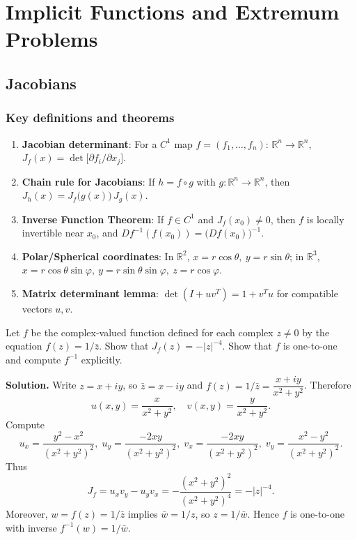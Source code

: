 \chapter{Implicit Functions and Extremum Problems}

\section{Jacobians}
\subsection*{Key definitions and theorems}
\begin{enumerate}[label=(\roman*)]
    \item \textbf{Jacobian determinant}: For a $C^1$ map $f=(f_1,\dots,f_n):\,\mathbb R^n\to\mathbb R^n$, $J_f(x)=\det\big[\partial f_i/\partial x_j\big]$.
    \item \textbf{Chain rule for Jacobians}: If $h=f\circ g$ with $g: \mathbb R^n\to\mathbb R^n$, then $J_h(x)=J_f\big(g(x)\big)\,J_g(x)$.
    \item \textbf{Inverse Function Theorem}: If $f\in C^1$ and $J_f(x_0)\neq 0$, then $f$ is locally invertible near $x_0$, and $D f^{-1}(f(x_0))=\big(D f(x_0)\big)^{-1}$.
    \item \textbf{Polar/Spherical coordinates}: In $\mathbb R^2$, $x=r\cos\theta,\ y=r\sin\theta$; in $\mathbb R^3$, $x=r\cos\theta\sin\varphi,\ y=r\sin\theta\sin\varphi,\ z=r\cos\varphi$.
    \item \textbf{Matrix determinant lemma}: $\det(I+uv^{\!T})=1+v^{\!T}u$ for compatible vectors $u,v$.
\end{enumerate}
\begin{problembox}
Let \( f \) be the complex-valued function defined for each complex \( z \neq 0 \) by the equation \( f(z) = 1/\bar{z} \). Show that \( J_f(z) = -|z|^{-4} \). Show that \( f \) is one-to-one and compute \( f^{-1} \) explicitly.
\end{problembox}

\noindent\textbf{Solution.}
Write $z=x+iy$, so $\bar z=x-iy$ and $f(z)=1/\bar z=\dfrac{x+iy}{x^2+y^2}$. Therefore
\[u(x,y)=\frac{x}{x^2+y^2},\quad v(x,y)=\frac{y}{x^2+y^2}.
\]
Compute
\[u_x=\frac{y^2-x^2}{(x^2+y^2)^2},\; u_y=\frac{-2xy}{(x^2+y^2)^2},\; v_x=\frac{-2xy}{(x^2+y^2)^2},\; v_y=\frac{x^2-y^2}{(x^2+y^2)^2}.
\]
Thus
\[J_f=u_xv_y-u_yv_x=-\frac{(x^2+y^2)^2}{(x^2+y^2)^4}=-|z|^{-4}.
\]
Moreover, $w=f(z)=1/\bar z$ implies $\bar w=1/z$, so $z=1/\bar w$. Hence $f$ is one-to-one with inverse $f^{-1}(w)=1/\bar w$.

